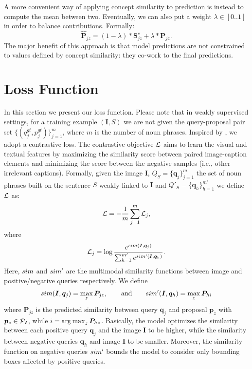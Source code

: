 A more convenient way of applying concept similarity to prediction is
instead to compute the mean between two. Eventually, we can also put a
weight $\lambda \in [0 .. 1]$ in order to balance
contributions. Formally:
\begin{equation}
  \bm{\hat{P}}_{jz} = (1 - \lambda) * \bm{S}^c_{jz} + \lambda * \bm{P}_{jz}.
\end{equation}
The major benefit of this approach is that model predictions are not
constrained to values defined by concept similarity: they co-work to
the final predictions.

\section{Loss Function}
\label{sec:loss}

In this section we present our loss function. Please note that in
weakly supervised settings, for a training example $\left( \bm{I}, S
\right)$ we are not given the query-proposal pair set $\{ ( q^{gt}_j,
p^{gt}_j ) \}^m_{j=1}$, where $m$ is the number of noun phrases.
Inspired by \cite{wang2020maf}, we adopt a contrastive loss. The
contrastive objective $\mathcal{L}$ aims to learn the visual and textual
features by maximizing the similarity score between paired
image-caption elements and minimizing the score between the negative
samples (i.e., other irrelevant captions). Formally, given the image
$\bm{I}$, $Q_S = \{ \bm{q}_j \}^m_{j=1}$ the set of noun phrases built
on the sentence $S$ weakly linked to $\bm{I}$ and $Q'_S = \{ \bm{q}_h
\}^{m'}_{h=1}$ we define $\mathcal{L}$ as:
\begin{equation}
  \mathcal{L} = - \frac{1}{m} \sum^m_{j=1} \mathcal{L}_j,
\end{equation}
where
\begin{equation}
  \mathcal{L}_j = \log \frac{e^{sim(\bm{I}, \bm{q}_j)}}{\sum^{m'}_{h = 1} e^{sim'(\bm{I}, \bm{q}_{h})}}.
\end{equation}
Here, $sim$ and $sim'$ are the multimodal similarity functions
between image and positive/negative queries respectively. We define
\begin{equation}
  sim(\bm{I}, \bm{q}_j) = \max_{z} \bm{P}_{jz}, \qquad \text{and} \qquad sim'(\bm{I}, \bm{q}_h) = \max_z \bm{P}_{hi}
\end{equation}
where $\bm{P}_{jz}$ is the predicted similarity between query
$\bm{q}_j$ and proposal $\bm{p}_z$ with $\bm{p}_z \in \mathcal{P}_{\bm{I}}$,
while $i = \operatorname*{arg\,max}_z \bm{P}_{hz}$. Basically, the model optimizes the
similarity between each positive query $\bm{q}_j$ and the image
$\bm{I}$ to be higher, while the similarity between negative queries
$\bm{q}_h$ and image $\bm{I}$ to be smaller. Moreover, the similarity
function on negative queries $sim'$ bounds the model to consider
only bounding boxes affected by positive queries.

